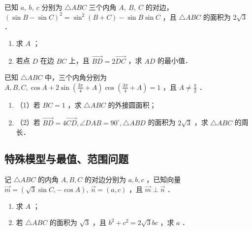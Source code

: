 \begin{example}
    已知 $a, ~ b, ~ c$ 分别为 $\triangle A B C$ 三个内角 $A, ~ B, ~ C$ 的对边，$(\sin B-\sin C)^2=\sin ^2(B+C)-\sin B \sin C$ ，且 $\triangle A B C$ 的面积为 $2 \sqrt{3}$ ．
    \begin{enumerate}
        \item 求 $A$ ；
        \item 若点 $D$ 在边 $BC$ 上，且 $\overrightarrow{BD}=2 \overrightarrow{DC}$ ，求 $A D$ 的最小值．
    \end{enumerate}
\end{example}
\vspace{4em}

\begin{example}
    已知 $\triangle A B C$ 中，三个内角分别为 $A, B, C, \cos A+2 \sin \left(\frac{3 \pi}{4}+A\right) \cos \left(\frac{3 \pi}{4}+A\right)=1$ ，且 $A \neq \frac{\pi}{2}$ ．
    \begin{enumerate}
        \item （1）若 $B C=1$ ，求 $\triangle A B C$ 的外接圆面积；
        \item （2）若 $\overrightarrow{B D}=4 \overrightarrow{C D}, \angle D A B=90^{\circ}, \triangle A B D$ 的面积为 $2 \sqrt{3}$ ，求 $\triangle A B C$ 的周长．
    \end{enumerate}
\end{example}
\vspace{4em}

\subsection{特殊模型与最值、范围问题}

\begin{example}
    记 $\triangle A B C$ 的内角 $A, B, C$ 的对边分别为 $a, b, c$ ，已知向量 $\overrightarrow{m}=(\sqrt{3} \sin C,-\cos A), ~ \overrightarrow{n}=(a, c)$ ，且 $\overrightarrow{m} \perp \overrightarrow{n}$ ．
    \begin{enumerate}
        \item 求 $A$ ；
        \item 若 $\triangle A B C$ 的面积为 $\sqrt{3}$ ，且 $b^2+c^2=2 \sqrt{3} b c$ ，求 $a$ ．
    \end{enumerate}
\end{example}
\vspace{4em}

